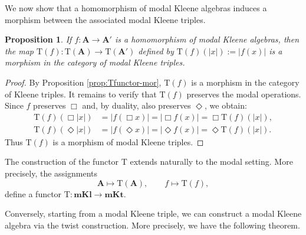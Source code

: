 \documentclass[10pt,a4paper]{amsart}
\newtheorem{proposition}[theorem]{Proposition}
\newcommand{\A}{\mathbf{A}}
\begin{document}
We now show that a homomorphism of modal Kleene algebras induces a morphism between the associated modal Kleene triples.

\begin{proposition}\label{moorfismos mkl}
    If $f : \A \rightarrow \A'$ is a homomorphism of modal Kleene algebras, then the map $\mathrm{T}(f) :\mathrm{T}(\A) \rightarrow \mathrm{T}(\A')$ defined by $\mathrm{T}(f)(|x|) := |f(x)|$ is a morphism in the category of modal Kleene triples.
\end{proposition}
\begin{proof}
    By Proposition \ref{prop:Tfunctor-mor}, $\mathrm{T}(f)$ is a morphism in the category of Kleene triples. It remains to verify that $\mathrm{T}(f)$ preserves the modal operations. Since $f$ preserves $\Box$ and, by duality, also preserves $\Diamond$, we obtain:
    \begin{align*}
        \mathrm{T}(f)(\Box|x|) &= |f(\Box x)| = |\Box f(x)| = \Box \mathrm{T}(f)(|x|),\\
        \mathrm{T}(f)(\Diamond|x|) &= |f(\Diamond x)| = |\Diamond f(x)| = \Diamond \mathrm{T}(f)(|x|).
    \end{align*}
    Thus $\mathrm{T}(f)$ is a morphism of modal Kleene triples.
\end{proof}

The construction of the functor $\mathrm{T}$ extends naturally to the modal setting. More precisely, the assignments
\[
\A\mapsto\mathrm{T}(\A),\qquad
f\mapsto\mathrm{T}(f),
\]
define a functor $\mathrm{T}:\mathbf{mKl}\longrightarrow\mathbf{mKt}$.

Conversely, starting from a modal Kleene triple, we can construct a modal Kleene algebra via the twist construction. More precisely, we have the following theorem.
\end{document}
